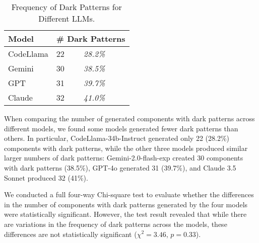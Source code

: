 \setlength{\intextsep}{0pt}
\begin{wraptable}[8]{r}{4.2cm}
\begin{tabular}{l l l}\toprule  
Model & \multicolumn{2}{l}{\# Dark Patterns} \\\midrule
CodeLlama& 22 & \textit{28.2\%}\\
Gemini & 30 & \textit{38.5\%}\\
GPT & 31 & \textit{39.7\%}\\
Claude & 32 & \textit{41.0\%}\\
\bottomrule
\end{tabular}
\caption{Frequency of Dark Patterns for Different LLMs.}\label{tab:results-models}
\end{wraptable}
When comparing the number of generated components with dark patterns across different models, we found some models generated fewer dark patterns than others. In particular, CodeLlama-34b-Instruct generated only 22 (28.2\%) components with dark patterns, while the other three models produced similar larger numbers of dark patterns: Gemini-2.0-flash-exp created 30 components with dark patterns (38.5\%), GPT-4o generated 31 (39.7\%), and Claude 3.5 Sonnet produced 32 (41\%). %

We conducted a full four-way Chi-square test to evaluate whether the differences in the number of components with dark patterns generated by the four models were statistically significant. However, the test result revealed that while there are variations in the frequency of dark patterns across the models, these differences are not statistically significant ($\chi^2=3.46$, $p=0.33$). 


